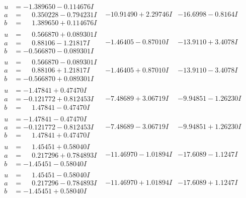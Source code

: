 \documentclass[1p]{elsarticle_modified}
\theoremstyle{definition}
\begin{document}
$$\begin{array}{c|c|c}
\begin{aligned}
u &= -1.389650 - 0.114676 I \\
a &= \phantom{-}0.350228 - 0.794231 I \\
b &= \phantom{-}1.389650 + 0.114676 I\end{aligned}
 & -10.91490 + 2.29746 I & -16.6998 - 0.8164 I \\ \hline\begin{aligned}
u &= \phantom{-}0.566870 + 0.089301 I \\
a &= \phantom{-}0.88106 - 1.21817 I \\
b &= -0.566870 - 0.089301 I\end{aligned}
 & -1.46405 - 0.87010 I & -13.9110 + 3.4078 I \\ \hline\begin{aligned}
u &= \phantom{-}0.566870 - 0.089301 I \\
a &= \phantom{-}0.88106 + 1.21817 I \\
b &= -0.566870 + 0.089301 I\end{aligned}
 & -1.46405 + 0.87010 I & -13.9110 - 3.4078 I \\ \hline\begin{aligned}
u &= -1.47841 + 0.47470 I \\
a &= -0.121772 + 0.812453 I \\
b &= \phantom{-}1.47841 - 0.47470 I\end{aligned}
 & -7.48689 + 3.06719 I & -9.94851 - 1.26230 I \\ \hline\begin{aligned}
u &= -1.47841 - 0.47470 I \\
a &= -0.121772 - 0.812453 I \\
b &= \phantom{-}1.47841 + 0.47470 I\end{aligned}
 & -7.48689 - 3.06719 I & -9.94851 + 1.26230 I \\ \hline\begin{aligned}
u &= \phantom{-}1.45451 + 0.58040 I \\
a &= \phantom{-}0.217296 + 0.784893 I \\
b &= -1.45451 - 0.58040 I\end{aligned}
 & -11.46970 - 1.01894 I & -17.6089 - 1.1247 I \\ \hline\begin{aligned}
u &= \phantom{-}1.45451 - 0.58040 I \\
a &= \phantom{-}0.217296 - 0.784893 I \\
b &= -1.45451 + 0.58040 I\end{aligned}
 & -11.46970 + 1.01894 I & -17.6089 + 1.1247 I \\ \hline\begin{aligned}

\end{aligned}
\end{array}$$
\end{document}
